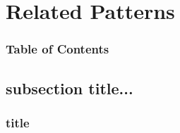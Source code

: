 \documentclass[xcolor=dvipsnames]{beamer}
\begin{document}
\section{Related Patterns} 

	\begin{frame} \frametitle{Table of Contents}
		\tableofcontents[currentsection]
	\end{frame} 
	
	
	\subsection{subsection title...}
	
		\begin{frame} \frametitle{title}
	
		\end{frame}
\end{document}
